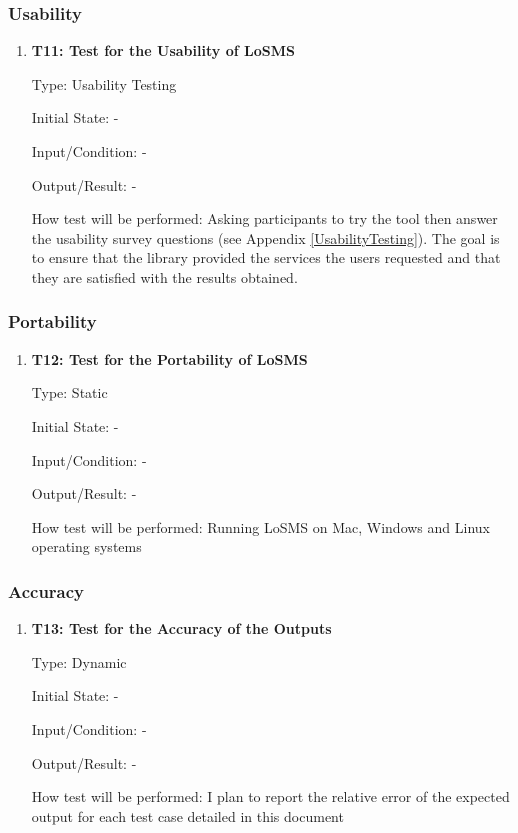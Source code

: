 \documentclass[12pt, titlepage]{article}
\newcommand{\famname}{LoSMS} %
\begin{document}
\subsubsection{Usability}

\begin{enumerate}
	\item{\textbf{T11: Test for the Usability of \famname{}}}
	
	Type: Usability Testing
						
	Initial State: -
						
	Input/Condition: -
						
	Output/Result: -
						
	How test will be performed: Asking participants to try the tool 
        then answer the usability survey questions (see Appendix
        \ref{UsabilityTesting}). The goal is to ensure that the library provided
        the services the users requested and that they are satisfied with the
        results obtained.
\end{enumerate}

\subsubsection{Portability}

\begin{enumerate}
	\item{\textbf{T12: Test for the Portability of \famname{}}}
	
	Type: Static
	
	Initial State: -
	
	Input/Condition: -
	
	Output/Result: -
	
	How test will be performed: Running \famname{} on Mac, Windows and Linux 
	operating systems
\end{enumerate}

\subsubsection{Accuracy}

\begin{enumerate}
	\item{\textbf{T13: Test for the Accuracy of the Outputs}}

	Type: Dynamic
	
	Initial State: -
	
	Input/Condition: -
	
	Output/Result: -
	
	How test will be performed: I plan to report the relative error of the 
	expected output for each test case detailed in this document

\end{enumerate}
\end{document}
